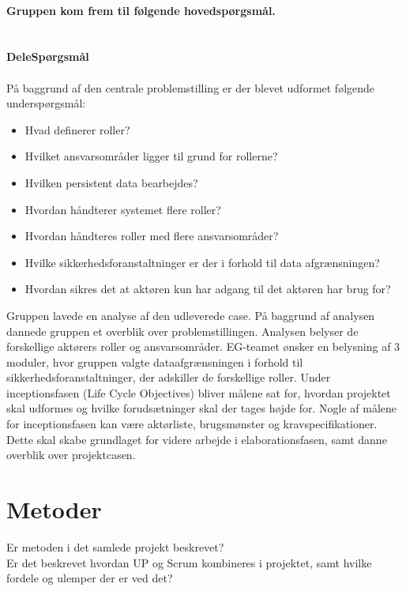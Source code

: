 \textbf{\\Gruppen kom frem til følgende hovedspørgsmål.}\\ \\
\noindent{}
 \textbf{\\DeleSpørgsmål\\}\\
På baggrund af den centrale problemstilling er der blevet udformet følgende underspørgsmål:\\ 
\begin{itemize}
\item Hvad definerer roller?
\item Hvilket ansvarsområder ligger til grund for rollerne?
\item Hvilken persistent data bearbejdes?
\item Hvordan håndterer systemet flere roller?
\item Hvordan håndteres roller med flere ansvarsområder?
\item Hvilke sikkerhedsforanstaltninger er der i forhold til data afgrænsningen?
\item Hvordan sikres det at aktøren kun har adgang til det aktøren har brug for? 
\end{itemize}
Gruppen lavede en analyse af den udleverede case. På baggrund af analysen dannede gruppen et overblik over problemstillingen. Analysen belyser de forskellige aktørers roller og ansvarsområder. EG-teamet ønsker en belysning af 3 moduler, hvor gruppen valgte dataafgrænsningen i forhold til sikkerhedsforanstaltninger, der adskiller de forskellige roller.
Under inceptionsfasen (Life Cycle Objectives) bliver målene sat for, hvordan projektet skal udformes og hvilke forudsætninger skal der tages højde for. Nogle af målene for inceptionsfasen kan være aktørliste, brugsmønster og kravspecifikationer. 
Dette skal skabe grundlaget for videre arbejde i elaborationsfasen, samt danne overblik over projektcasen. 



\section{Metoder}
Er metoden i det samlede projekt beskrevet?\\
Er det beskrevet hvordan UP og Scrum kombineres i projektet, samt hvilke fordele og ulemper der er ved det?\\

